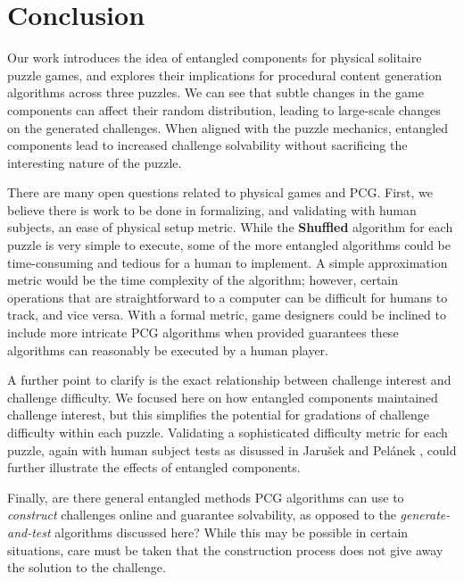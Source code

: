 \documentclass[journal]{IEEEtran}
\begin{document}
%

\section{Conclusion}   \label{sec:Conclusion}

\noindent
Our work introduces the idea of entangled components for physical solitaire puzzle games, and explores their implications for procedural content generation algorithms across three puzzles. We can see that subtle changes in the game components can affect their random distribution, leading to large-scale changes on the generated challenges. When aligned with the puzzle mechanics, entangled components lead to increased challenge solvability without sacrificing the interesting nature of the puzzle.

There are many open questions related to physical games and PCG. First, we believe there is work to be done in formalizing, and validating with human subjects, an ease of physical setup metric. While the \textbf{Shuffled} algorithm for each puzzle is very simple to execute, some of the more entangled algorithms could be time-consuming and tedious for a human to implement. A simple approximation metric would be the time complexity of the algorithm; however, certain operations that are straightforward to a computer can be difficult for humans to track, and vice versa. With a formal metric, game designers could be inclined to include more intricate PCG algorithms when provided guarantees these algorithms can reasonably be executed by a human player.

A further point to clarify is the exact relationship between challenge interest and challenge difficulty. We focused here on how entangled components maintained challenge interest, but this simplifies the potential for gradations of challenge difficulty within each puzzle. Validating a sophisticated difficulty metric for each puzzle, again with human subject tests as disussed in Jaru{\v{s}}ek and Pel{\'a}nek \cite{jaruvsek2011determines}, could further illustrate the effects of entangled components.

%

Finally, are there general entangled methods PCG algorithms can use to {\it construct} challenges online and guarantee solvability, as opposed to the {\it generate-and-test} algorithms discussed here? While this may be possible in certain situations, 
%
care must be taken that the construction process does not give away the solution to the challenge.
\end{document}
